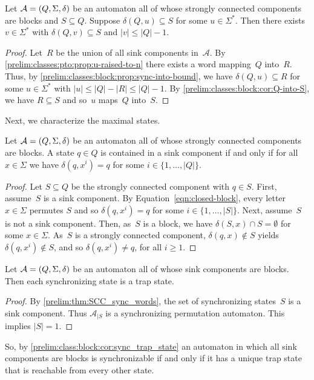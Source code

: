 \begin{corollary} \label{prelim:classes:block:cor:Q-into-S-bound}
	Let $\mathcal A = (Q, \Sigma, \delta)$ be an automaton all of whose strongly connected components are blocks and $S \subseteq Q$.
Suppose $\delta(Q, u) \subseteq S$ for some $u \in \Sigma^*$.
Then there exists $v \in \Sigma^*$
with $\delta(Q, v) \subseteq S$ and $|v| \le |Q| - 1$.		
\end{corollary}
\begin{proof}
	Let~$R$ be the union of all sink components in~$\mathcal A$.
	By \cref{prelim:classes:pto:prop:u-raised-to-n} 
	there exists a word mapping~$Q$ into~$R$.
	Thus, by \cref{prelim:classes:block:prop:sync-into-bound},
	we have $\delta(Q, u) \subseteq R$
	for some $u \in \Sigma^*$ with $|u| \le |Q| - |R| \le |Q| - 1$.
	By \cref{prelim:classes:block:cor:Q-into-S},
	we have $R \subseteq S$
	and so~$u$ maps~$Q$ into~$S$.	
\end{proof}

Next, we characterize the maximal states.

\begin{proposition} \label{prelim:classes:block:prop:char-sink-state}
	Let $\mathcal A = (Q, \Sigma, \delta)$ be an automaton all of whose strongly connected components are blocks.
	A state $q \in Q$ is contained in a sink component
	if and only if for all $x \in \Sigma$ we have $\delta(q, x^i) = q$
	for some $i \in \{1,\ldots,|Q|\}$.
\end{proposition}
\begin{proof}
	Let $S \subseteq Q$ be the strongly connected component 
	with $q \in S$.
	First, assume~$S$ is a sink component.
	By Equation~\eqref{eqn:closed-block}, every letter $x \in \Sigma$
	permutes $S$ and so $\delta(q, x^i) = q$
	for some $i \in \{1,\ldots,|S|\}$.
	Next, assume~$S$ is not a sink component.
	Then, as~$S$ is a block,
	we have $\delta(S, x) \cap S = \emptyset$
	for some $x \in \Sigma$.
	As~$S$ is a strongly connected component,
	$\delta(q, x) \notin S$ yields $\delta(q, x^i) \notin S$,
	and so $\delta(q, x^i) \ne q$,
	for all $i \ge 1$.
\end{proof}

\begin{proposition} \label{prelim:class:block:cor:sync_trap_state} \label{constr_sync:prop:sink-blocks-sync-trap}
	Let $\mathcal A = (Q, \Sigma, \delta)$ be an automaton all of whose sink components are blocks.
	Then each synchronizing state is a trap state.
\end{proposition}
\begin{proof}
	By \cref{prelim:thm:SCC_sync_words}, the set of synchronizing states~$S$
	is a sink component.
	Thus $\mathcal A_{|S}$ is a synchronizing permutation automaton. 
	This implies $|S| = 1$.
\end{proof}

So, by \cref{prelim:class:block:cor:sync_trap_state} 
an automaton in which all sink components are blocks is synchronizable
if and only if it has a unique trap state that is reachable from every other state. 
